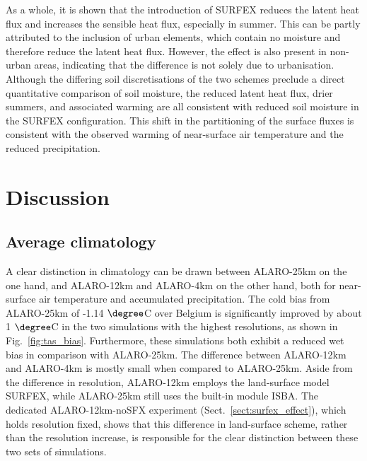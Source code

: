 \documentclass[journal abbreviation, manuscript]{copernicus}
\begin{document}
As a whole, it is shown that the introduction of SURFEX reduces the latent heat flux and increases the sensible heat flux, especially in summer.
This can be partly attributed to the inclusion of urban elements, which contain no moisture and therefore reduce the latent heat flux.
However, the effect is also present in non-urban areas, indicating that the difference is not solely due to urbanisation.
Although the differing soil discretisations of the two schemes preclude a direct quantitative comparison of soil moisture, the reduced latent heat flux, drier summers, and associated warming are all consistent with reduced soil moisture in the SURFEX configuration.
This shift in the partitioning of the surface fluxes is consistent with the observed warming of near-surface air temperature and the reduced precipitation.



\section{Discussion}
\label{sect:discussion}

\subsection{Average climatology}

A clear distinction in climatology can be drawn between ALARO-25km on the one hand, and ALARO-12km and ALARO-4km on the other hand, both for near-surface air temperature and accumulated precipitation. 
The cold bias from ALARO-25km of -1.14 $\degree$C over Belgium is significantly improved by about 1 $\degree$C in the two simulations with the highest resolutions, as shown in Fig.~\ref{fig:tas_bias}. 
Furthermore, these simulations both exhibit a reduced wet bias in comparison with ALARO-25km. 
The difference between ALARO-12km and ALARO-4km is mostly small when compared to ALARO-25km.
Aside from the difference in resolution, ALARO-12km employs the land-surface model SURFEX, while ALARO-25km still uses the built-in module ISBA. 
The dedicated ALARO-12km-noSFX experiment (Sect.~\ref{sect:surfex_effect}), which holds resolution fixed, shows that this difference in land-surface scheme, rather than the resolution increase, is responsible for the clear distinction between these two sets of simulations.
\end{document}
